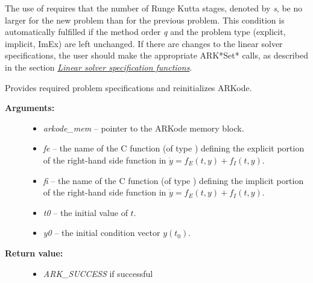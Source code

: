 \documentclass[letterpaper,10pt,english]{sphinxmanual}
\begin{document}
The use of {\hyperref[c_interface/User_callable:ARKodeReInit]{}} requires that the number of Runge
Kutta stages, denoted by \emph{s}, be no larger for the new problem than
for the previous problem.  This condition is automatically fulfilled
if the method order \emph{q} and the problem type (explicit, implicit,
ImEx) are left unchanged.  If there are changes to the linear solver
specifications, the user should make the appropriate ARK*Set* calls,
as described in the section {\hyperref[c_interface/User_callable:cinterface-linearsolvers]{\emph{Linear solver specification functions}}}.

\begin{fulllineitems}
\label{c_interface/User_callable:ARKodeReInit}
Provides required problem specifications and reinitializes ARKode.
\begin{description}
\item[{\textbf{Arguments:}}] \leavevmode\begin{itemize}
\item {} 
\emph{arkode\_mem} -- pointer to the ARKode memory block.

\item {} 
\emph{fe} -- the name of the C function (of type {\hyperref[c_interface/User_supplied:ARKRhsFn]{}})
defining the explicit portion of the right-hand side function in
$\dot{y} = f_E(t,y) + f_I(t,y)$.

\item {} 
\emph{fi} -- the name of the C function (of type {\hyperref[c_interface/User_supplied:ARKRhsFn]{}})
defining the implicit portion of the right-hand side function in
$\dot{y} = f_E(t,y) + f_I(t,y)$.

\item {} 
\emph{t0} -- the initial value of $t$.

\item {} 
\emph{y0} -- the initial condition vector $y(t_0)$.

\end{itemize}

\item[{\textbf{Return value:}}] \leavevmode\begin{itemize}
\item {} 
\emph{ARK\_SUCCESS} if successful


\end{itemize}
\end{description}
\end{fulllineitems}
\end{document}

